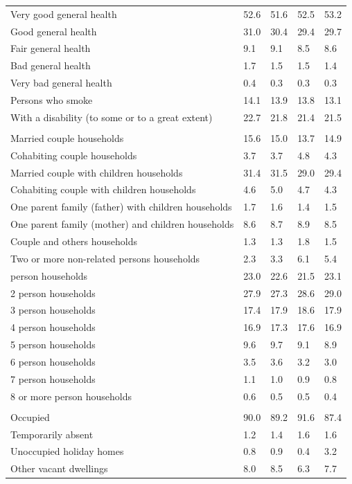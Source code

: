 \documentclass{article}
\begin{document}
\begin{table}[h]
\begin{tabular}{KTTTT}
    \hline
Very good general health & 52.6& 51.6&52.5& 53.2\\
Good general health & 31.0& 30.4& 29.4& 29.7\\
Fair general health & 9.1& 9.1&8.5& 8.6\\
Bad general health & 1.7& 1.5&1.5& 1.4\\
Very bad general health & 0.4& 0.3&0.3& 0.3\\
    \hline
Persons who smoke & 14.1& 13.9&13.8& 13.1\\
    \hline
With a disability (to some or to a great extent) & 22.7& 21.8&21.4& 21.5\\
\hline
    \\ 
    \hline
Married couple households & 15.6& 15.0& 13.7& 14.9\\
Cohabiting couple households & 3.7& 3.7& 4.8& 4.3\\
Married couple with children households & 31.4& 31.5& 29.0& 29.4\\
Cohabiting couple with children households & 4.6& 5.0& 4.7& 4.3\\
One parent family (father) with  children households & 1.7& 1.6& 1.4& 1.5\\
One parent family (mother) and children households & 8.6& 8.7& 8.9& 8.5\\
Couple and others households  & 1.3& 1.3& 1.8& 1.5\\
Two or more non-related persons households & 2.3& 3.3& 6.1& 5.4\\
     person households & 23.0& 22.6& 21.5& 23.1\\
2 person households & 27.9& 27.3& 28.6& 29.0\\
3 person households & 17.4& 17.9& 18.6& 17.9\\
4 person households & 16.9& 17.3& 17.6& 16.9\\
5 person households & 9.6& 9.7& 9.1& 8.9\\
6 person households & 3.5& 3.6& 3.2& 3.0\\
7 person households & 1.1& 1.0& 0.9& 0.8\\
8 or more person households & 0.6& 0.5& 0.5& 0.4\\
\hline
    \\ 
    \hline
Occupied & 90.0& 89.2& 91.6& 87.4\\
Temporarily absent & 1.2& 1.4& 1.6& 1.6\\
Unoccupied holiday homes & 0.8& 0.9& 0.4& 3.2\\
Other vacant dwellings & 8.0& 8.5& 6.3& 7.7\\
\hline
\end{tabular}
\end{table}
\end{document}
